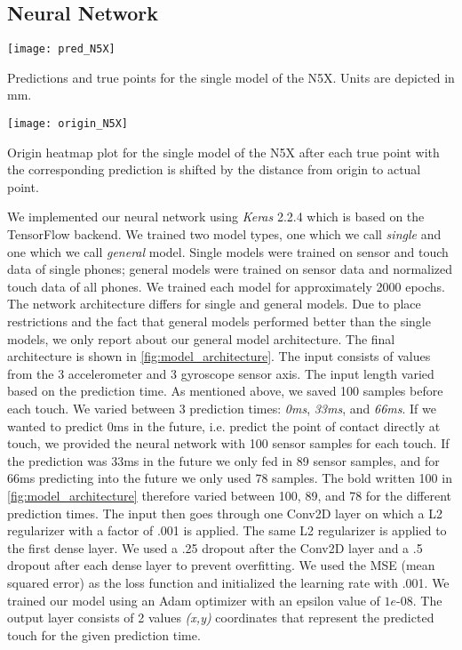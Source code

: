 \subsection{Neural Network}
\begin{marginfigure}
	\vspace{0.1cm}	
	\texttt{[image: pred\_N5X]}
	\caption{Predictions and true points for the single model of the N5X. Units are depicted in mm.\newline}
	\label{fig:pred_N5X}
\end{marginfigure}
\begin{marginfigure}
	\texttt{[image: origin\_N5X]}
	\caption{Origin heatmap plot for the single model of the N5X after each true point with the corresponding prediction is shifted by the distance from origin to actual point.}
	\label{fig:origin_N5X}
\end{marginfigure}
We implemented our neural network using \textit{Keras} 2.2.4 which is based on the TensorFlow backend.
We trained two model types, one which we call \textit{single} and one which we call \textit{general} model.
Single models were trained on sensor and touch data of single phones; general models were trained on sensor data and normalized touch data of all phones.
We trained each model for approximately 2000 epochs.
The network architecture differs for single and general models.
Due to place restrictions and the fact that general models performed better than the single models, we only report about our general model architecture.
The final architecture is shown in \cref{fig:model_architecture}.
The input consists of values from the 3 accelerometer and 3 gyroscope sensor axis.
The input length varied based on the prediction time.
As mentioned above, we saved 100 samples before each touch.
We varied between 3 prediction times: \textit{0ms}, \textit{33ms}, and \textit{66ms}.
If we wanted to predict 0ms in the future, i.e. predict the point of contact directly at touch, we provided the neural network with 100 sensor samples for each touch.
If the prediction was 33ms in the future we only fed in 89 sensor samples, and for 66ms predicting into the future we only used 78 samples.
The bold written 100 in \cref{fig:model_architecture} therefore varied between 100, 89, and 78 for the different prediction times.
The input then goes through one Conv2D layer on which a L2 regularizer with a factor of .001 is applied.
The same L2 regularizer is applied to the first dense layer.
We used a .25 dropout after the Conv2D layer and a .5 dropout after each dense layer to prevent overfitting.
We used the MSE (mean squared error) as the loss function and initialized the learning rate with .001.
We trained our model using an Adam optimizer with an epsilon value of $ 1e$-08.
The output layer consists of 2 values \textit{(x,y)} coordinates that represent the predicted touch for the given prediction time.

